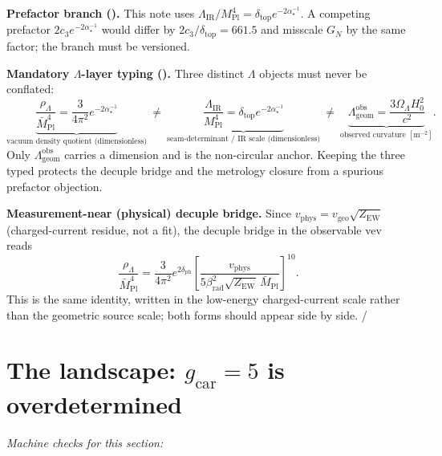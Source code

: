 \documentclass[11pt,a4paper]{article}
\newcommand{\MPl}{M_{\mathrm{Pl}}}
\newcommand{\Mbar}{\bar M_{\mathrm{Pl}}}
\newcommand{\GN}{G_N}
\newcommand{\gcar}{g_{\mathrm{car}}}
\newcommand{\cthree}{c_3}
\newcommand{\dtop}{\delta_{\mathrm{top}}}
\newcommand{\dph}{\delta_{\mathrm{ph}}}
\newcommand{\betarad}{\beta_{\mathrm{rad}}}
\newcommand{\ainv}{\alpha^{-1}_\star}
\newcommand{\LamIR}{\Lambda_{\mathrm{IR}}}
\newcommand{\Lamgeom}{\Lambda_{\mathrm{geom}}}
\theoremstyle{definition}
\begin{document}
\par\smallskip\noindent\textbf{Prefactor branch (\mO).}
This note uses $\LamIR/\MPl^4=\dtop e^{-2\ainv}$. A competing prefactor $2\cthree e^{-2\ainv}$ would
differ by $2\cthree/\dtop=661.5$ and misscale $\GN$ by the same factor; the branch must be versioned.
\par\smallskip

\par\smallskip\noindent\textbf{Mandatory $\Lambda$-layer typing (\mO).}
Three distinct $\Lambda$ objects must never be conflated:
\[
  \underbrace{\frac{\rho_\Lambda}{\Mbar^4}=\frac{3}{4\pi^2}e^{-2\ainv}}_{\text{vacuum density quotient (dimensionless)}}
  \ \neq\
  \underbrace{\frac{\LamIR}{\MPl^4}=\dtop e^{-2\ainv}}_{\text{seam-determinant / IR scale (dimensionless)}}
  \ \neq\
  \underbrace{\Lamgeom^{\mathrm{obs}}=\frac{3\Omega_\Lambda H_0^2}{c^2}}_{\text{observed curvature }[\mathrm{m}^{-2}]} .
\]
Only $\Lamgeom^{\mathrm{obs}}$ carries a dimension and is the non-circular anchor. Keeping the three
typed protects the decuple bridge and the metrology closure from a spurious prefactor objection.
\par\smallskip

\noindent\textbf{Measurement-near (physical) decuple bridge.} Since $v_{\mathrm{phys}}=v_{\mathrm{geo}}\sqrt{Z_{\mathrm{EW}}}$
(charged-current residue, not a fit), the decuple bridge in the observable vev reads
\begin{equation}
  \frac{\rho_\Lambda}{\Mbar^4}=\frac{3}{4\pi^2}e^{2\dph}
  \left[\frac{v_{\mathrm{phys}}}{5\betarad^2\sqrt{Z_{\mathrm{EW}}}\,\Mbar}\right]^{10}.
\end{equation}
This is the same identity, written in the low-energy charged-current scale rather than the geometric
source scale; both forms should appear side by side. \mE/\mC

\section{The landscape: $\gcar=5$ is overdetermined}
\noindent\emph{Machine checks for this section:}  
\end{document}
